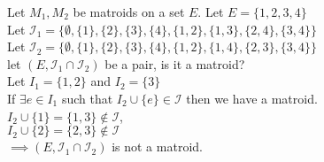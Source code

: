 \documentclass[../main.tex]{subfiles}
\begin{document}
\begin{exmp}
Let $M_1, M_2$ be matroids on a set $E.$ Let $E=\{1,2,3,4\}$\\
\noindent Let $\mathcal{I}_1 = \{\emptyset, \{1\},\{2\},\{3\},\{4\},\{1,2\},\{1,3\},\{2,4\},\{3,4\}\}$\\
\noindent Let $\mathcal{I}_2 = \{\emptyset, \{1\},\{2\},\{3\},\{4\},\{1,2\},\{1,4\},\{2,3\},\{3,4\}\}$\\
let $(E, \mathcal{I}_1 \cap \mathcal{I}_2)$ be a pair, is it a matroid?\\
Let $I_1 = \{1,2\}$ and $I_2=\{3\}$\\
If $\exists e \in I_1$ such that $I_2 \cup \{e\} \in \mathcal{I}$ then we have a matroid.\\
$I_2 \cup \{1\} = \{1,3\} \notin \mathcal{I}$,\\
$I_2 \cup \{2\} = \{2,3\} \notin \mathcal{I}$\\
\noindent $\implies (E, \mathcal{I}_1 \cap \mathcal{I}_2)$ is not a matroid.
\end{exmp}
\end{document}
